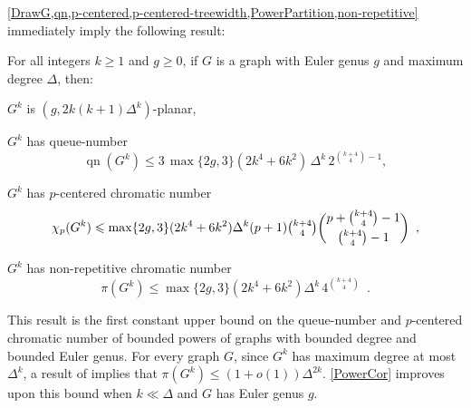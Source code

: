 \documentclass{patmorin}
\newcommand{\note}[2]{{\color{red}[#1:~#2]}}
\DeclareMathOperator{\qn}{qn}
\DeclarePairedDelimiter{\floor}{\lfloor}{\rfloor}
\renewcommand{\le}{\leqslant}
\renewcommand{\geq}{\geqslant}
\renewcommand{\leq}{\leqslant}
\begin{document}
\cref{DrawG,qn,p-centered,p-centered-treewidth,PowerPartition,non-repetitive} immediately imply the following result:



\begin{cor}
\label{PowerCor}
For all integers $k\geq 1$ and $g\geq 0$, if $G$ is a graph with Euler genus $g$ and maximum degree $\Delta$, then:
\begin{compactitem}
\item $G^k$ is $(g, 2k(k+1)\Delta^{k} )$-planar, 
\item $G^k$ has queue-number 
\[\qn(G^k) \leq 3\,\max\{2g,3\} (2k^4+6k^2) \,\Delta^{k}\, 2^{\binom{k+4}{4}-1},\]
\item $G^k$ has  $p$-centered chromatic number 
\[\chi_p(G^k) \leq \max\{2g,3\}(2k^4+6k^2) \Delta^{k}  (p+1) \tbinom{k+4}{4} 
\binom{p+\binom{k+4}{4}-1}{\binom{k+4}{4}-1}\enspace,\]
\item $G^k$ has  non-repetitive chromatic number
\[ \pi(G^k) \leq  \max\{2g,3\} (2k^4+6k^2) \Delta^{k} \, 4^{\binom{k+4}{4}}\enspace.\]
\end{compactitem}
\end{cor}

This result is the first constant upper bound on the queue-number and $p$-centered chromatic number of bounded powers of graphs with bounded degree and bounded Euler genus.  For every graph $G$, since $G^k$ has maximum degree at most $\Delta^k$, a result of \citet{DJKW16} implies that $\pi(G^k) \leq (1+o(1))\Delta^{2k}$. \cref{PowerCor} improves upon this bound when $k\ll\Delta$ and $G$ has Euler genus $g$.

\end{document}
